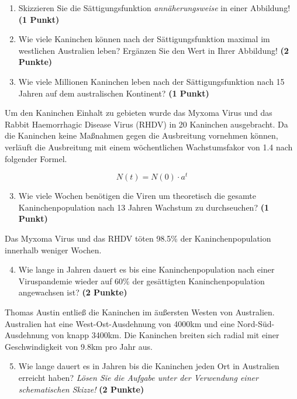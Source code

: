 \documentclass[a4paper, 9pt]{scrartcl}\usepackage[]{graphicx}\usepackage[]{xcolor}
\begin{document}
\begin{enumerate}
\item Skizzieren Sie die S{\"a}ttigungsfunktion \textit{ann{\"a}herungsweise} in einer Abbildung! \textbf{(1
    Punkt)}
\item Wie viele Kaninchen k{\"o}nnen nach der S{\"a}ttigungsfunktion maximal im
  westlichen Australien leben? Erg{\"a}nzen Sie den Wert in Ihrer Abbildung! \textbf{(2 Punkte)}
\item Wie viele Millionen Kaninchen leben nach der S{\"a}ttigungsfunktion
  nach 15 Jahren auf dem australischen Kontinent? \textbf{(1
    Punkt)}
\end{enumerate}

Um den Kaninchen Einhalt zu gebieten wurde das Myxoma Virus und das Rabbit
Haemorrhagic Disease Virus (RHDV) in 20 Kaninchen
ausgebracht. Da die Kaninchen keine Ma{\ss}nahmen gegen die Ausbreitung
vornehmen k{\"o}nnen, verl{\"a}uft die Ausbreitung mit einem w{\"o}chentlichen
Wachstumsfakor von 1.4 nach folgender Formel.

\begin{equation*}
  N(t) = N(0) \cdot a^t
\end{equation*}

\begin{enumerate}
  \setcounter{enumi}{2}
\item Wie viele Wochen ben{\"o}tigen die Viren um theoretisch die gesamte
  Kaninchenpopulation nach 13 Jahren Wachstum zu
  durchseuchen? \textbf{(1 Punkt)}
\end{enumerate}

Das Myxoma Virus und das RHDV t{\"o}ten 98.5\% der
Kaninchenpopulation innerhalb weniger Wochen.

\begin{enumerate}
  \setcounter{enumi}{3}  
\item Wie lange in Jahren dauert es bis eine Kaninchenpopulation nach einer
  Viruspandemie wieder auf 60\% der ges{\"a}ttigten
  Kaninchenpopulation angewachsen ist?  \textbf{(2 Punkte)}
\end{enumerate}

Thomas Austin entlie{\ss} die Kaninchen im {\"a}u{\ss}ersten Westen von
Australien. Australien hat eine West-Ost-Ausdehnung von 4000km
und eine Nord-S{\"u}d-Ausdehnung von knapp 3400km. Die Kaninchen
breiten sich radial mit einer Geschwindigkeit von 9.8km pro
Jahr aus.

\begin{enumerate}
  \setcounter{enumi}{4}
\item Wie lange dauert es in Jahren bis die Kaninchen jeden Ort
  in Australien erreicht haben? \textit{L{\"o}sen Sie die Aufgabe unter der
    Verwendung einer schematischen Skizze!} \textbf{(2 Punkte)}
\end{enumerate}
\end{document}
